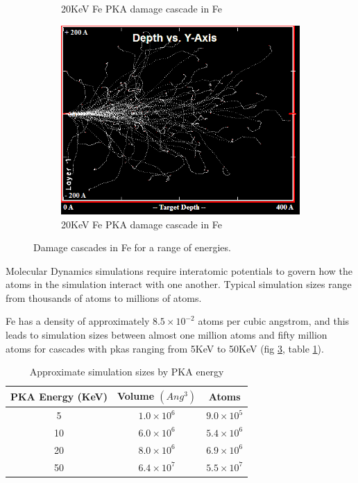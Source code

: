 \begin{figure}
\begin{subfigure}{.5\textwidth}
  \caption{20KeV Fe PKA damage cascade in Fe} 
  \label{fig:damagecascade5kev}
\end{subfigure}
\begin{subfigure}{.5\textwidth}
  \centering
  \includegraphics[width=.7\linewidth]{chapters/introduction/images/50KeV.png}  
  \caption{20KeV Fe PKA damage cascade in Fe} 
\label{fig:damagecascade10kev}
\end{subfigure}
\caption{Damage cascades in Fe for a range of energies.}
\label{fig:damagecascades}
\end{figure}


\FloatBarrier

Molecular Dynamics simulations require interatomic potentials to govern how the atoms in the simulation interact with one another.  Typical simulation sizes range from thousands of atoms to millions of atoms.

Fe has a density of approximately $8.5 \times 10^{-2}$ atoms per cubic angstrom, and this leads to simulation sizes between almost one million atoms and fifty million atoms for cascades with \acrshort{pka}s ranging from 5KeV to 50KeV (fig \ref{fig:damagecascades}, table \ref{table:fesimulationsize}).

\begin{table}[h]
\begin{center}
\renewcommand{\arraystretch}{1.2}
\begin{tabular}{c c c}
\hline\hline
PKA Energy (KeV) & Volume $(Ang^3)$ & Atoms \\
\hline\hline
5 & $1.0\times 10^6$ & $9.0\times 10^5$ \\
10 & $6.0\times 10^6$ & $5.4\times 10^6$ \\
20 & $8.0\times 10^6$ & $6.9\times 10^6$ \\
50 & $6.4\times 10^7$ & $5.5\times 10^7$ \\
\hline\hline
\end{tabular}
\end{center}
\caption{Approximate simulation sizes by PKA energy}
\label{table:fesimulationsize}
\end{table}

